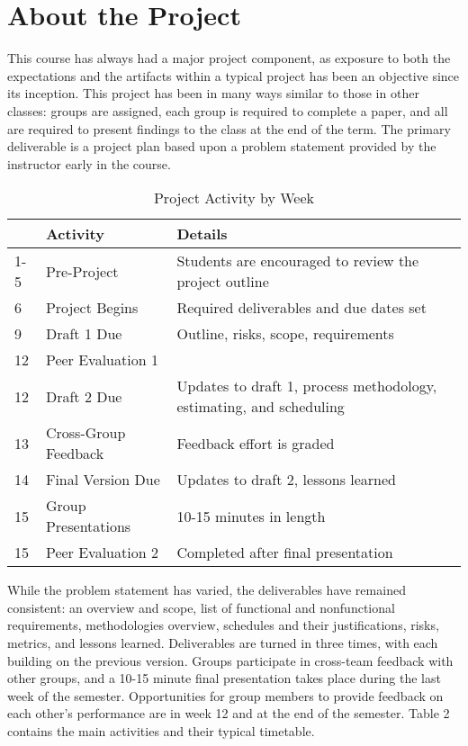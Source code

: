 \documentclass{sig-alternate}
\begin{document}
\section{About the Project}
\label{sec:project}
This course has always had a major project component, as exposure to both the expectations and the artifacts
within a typical project has been an objective since its inception.  This project has been in many ways similar to those in other classes: 
groups are assigned, each group is required to complete a paper, and all are required to present findings to the
class at the end of the term. The primary deliverable is a project plan based upon a problem
statement provided by the instructor early in the course.

\begin{table}
\label{table:projectsched}
\caption{Project Activity by Week}
\begin{tabular}{|p{0.3cm}|p{2.5cm}|p{4.4cm}|} \hline
\cellcolor[gray]{0.9}&\textbf{Activity}\cellcolor[gray]{0.9}&\textbf{Details}\cellcolor[gray]{0.9}\\ \hline
1-5&Pre-Project&Students are encouraged to review the project outline\\ \hline
6&Project Begins&Required deliverables and due dates set\\ \hline
9&Draft 1 Due&Outline, risks, scope, requirements\\ \hline
12&Peer Evaluation 1&\\ \hline
12&Draft 2 Due&Updates to draft 1, process methodology, estimating, and scheduling\\ \hline
13&Cross-Group Feedback&Feedback effort is graded\\ \hline
14&Final Version Due&Updates to draft 2, lessons learned\\ \hline
15&Group Presentations&10-15 minutes in length\\ \hline
15&Peer Evaluation 2&Completed after final presentation\\ 
\hline\end{tabular}
\end{table}

While the problem statement has varied, the deliverables have remained consistent: an overview and scope, list of
functional and nonfunctional requirements, methodologies overview, schedules and their justifications,
risks, metrics, and lessons learned. Deliverables are turned in three times, with each building on the
previous version. Groups participate in cross-team feedback with other groups, and a 10-15 minute final
presentation takes place during the last week of the semester. Opportunities for group members to
provide feedback on each other's performance are in week 12 and at the end of the semester. Table 2 
contains the main activities and their typical timetable.
\end{document}
